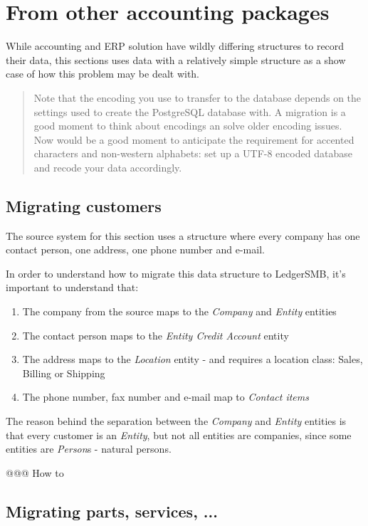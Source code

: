 \section{From other accounting packages}

While accounting and ERP solution have wildly differing structures to record their
data, this sections uses data with a relatively simple structure as a show case of
how this problem may be dealt with.

\begin{quote}
Note that the encoding you use to transfer to the database depends on the settings
used to create the PostgreSQL database with.  A migration is a good moment to think
about encodings an solve older encoding issues.  Now would be a good moment to
anticipate the requirement for accented characters and non-western alphabets: set up
a UTF-8 encoded database and recode your data accordingly.
\end{quote}

\subsection{Migrating customers}

The source system for this section uses a structure where every company has one
contact person, one address, one phone number and e-mail.

In order to understand how to migrate this data structure to LedgerSMB, it's
important to understand that:

\begin{enumerate}
\item The company from the source maps to the \emph{Company} and \emph{Entity} entities
\item The contact person maps to the \emph{Entity Credit Account} entity
\item The address maps to the \emph{Location} entity - and requires a location class: Sales, Billing or Shipping
\item The phone number, fax number and e-mail map to \emph{Contact items}
\end{enumerate}

The reason behind the separation between the \emph{Company} and \emph{Entity} entities
is that every customer is an \emph{Entity}, but not all entities are companies, since
some entities are \emph{Person}s - natural persons.

@@@ How to

\subsection{Migrating parts, services, ...}
